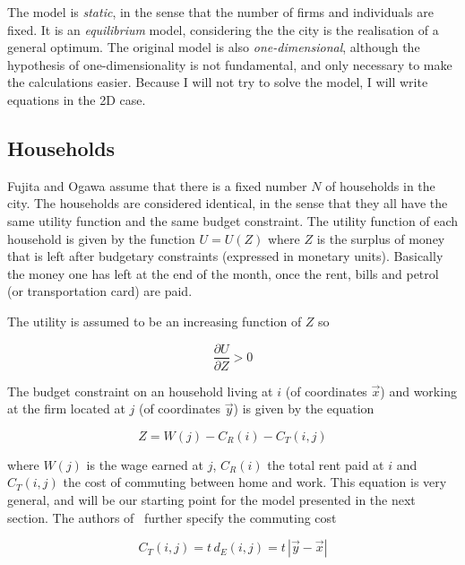 The model is \emph{static}, in the sense that the number of firms and
individuals are fixed. It is an \emph{equilibrium} model, considering the the
city is the realisation of a general optimum. The original model is also
\emph{one-dimensional}, although the hypothesis of one-dimensionality is not
fundamental, and only necessary to make the calculations easier. Because I will
not try to solve the model, I will write equations in the 2D case.

\subsection{Households} 
\label{sub:households}

Fujita and Ogawa assume that there is a fixed number $N$ of households in the
city. The households are considered identical, in the sense that they all have
the same utility function and the same budget constraint. The utility function
of each household is given by the function $U = U(Z)$ where $Z$ is the surplus
of money that is left after budgetary constraints (expressed in monetary units).
Basically the money one has left at the end of the month, once the rent, bills
and petrol (or transportation card) are paid. 

The utility is assumed to be an increasing function of $Z$ so

\begin{equation}
    \frac{\partial U}{\partial Z} > 0
\end{equation}

The budget constraint on an household living at $i$ (of coordinates $\vec{x}$)
and working at the firm located at $j$ (of coordinates $\vec{y}$) is given by the
equation

\begin{equation}
    Z = W\left(j\right)
      - C_R\left(i\right)
      - C_T\left(i,j\right)
\end{equation} 

where $W\left(j\right)$ is the wage earned at $j$, $C_R\left(i\right)$ the total
rent paid at $i$ and $C_T\left(i,j\right)$ the cost of commuting between
home and work. This equation is very general, and will be our starting point for
the model presented in the next section. The authors of~\cite{Fujita:1982}
further specify the commuting cost

\begin{equation}
    C_T\left(i,j\right) = t\,d_E(i,j) = t\,\left|\vec{y}-\vec{x}\right|
\end{equation}

